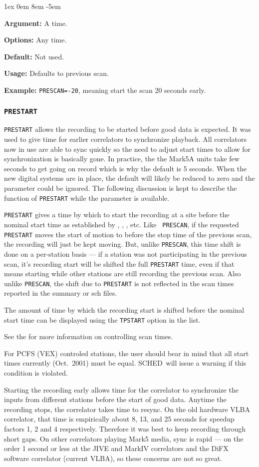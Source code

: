 \documentclass{report}
\newcommand{\schedb}{{\sc SCHED~}}
\newcommand{\rcwbox}[5]{
  \begin{list}{}{\parsep 1ex  \itemsep 0em
                 \leftmargin 8em  \itemindent -5em }
    \item {\bf Argument:} #1
    \item {\bf Options:}  #2
    \item {\bf Default:}  #3
    \item {\bf Usage:}    #4
    \item {\bf Example:}  #5
  \end{list}
}
\begin{document}
\rcwbox
{A time.}
{Any time.}
{Not used.}
{Defaults to previous scan.}
{{\tt PRESCAN=-20}, meaning start the scan 20 seconds early.}

\subsubsection{\label{MP:PRESTART}{\tt PRESTART}}

{\tt PRESTART} allows the recording to be started before good data is
expected.  It was used to give time for earlier correlators to
synchronize playback.  All correlators now in use are able to sync
quickly so the need to adjust start times to allow for synchronization
is basically gone.  In practice, the the Mark5A units take few seconds to get
going on record which is why the default is 5 seconds.  When the
new digital systems are in place, the default will likely be reduced
to zero and the parameter could be ignored.  The following
discussion is kept to describe the function of {\tt PRESTART} while
the parameter is available.

{\tt PRESTART} gives a time by which to start the recording at a
site before the nominal start time as established by , , ,  etc.  Like {\tt
PRESCAN}, if the requested {\tt PRESTART} moves the start of motion to
before the stop time of the previous scan, the recording will just be kept
moving.  But, unlike {\tt PRESCAN}, this time shift is done on a
per-station basis --- if a station was not participating in the
previous scan, it's recording start will be shifted the full
{\tt PRESTART} time, even if that means starting while other stations
are still recording the previous scan.  Also unlike {\tt PRESCAN},
the shift due to {\tt PRESTART} is not reflected in the scan
times reported in the summary or sch files.

The amount of time by which the recording start is shifted before
the nominal start time can be displayed using the {\tt TPSTART} option
in the  list.

See the  for more
information on controlling scan times.

For PCFS (VEX) controled stations, the user should bear in mind that
all start times currently (Oct.\ 2001) must be equal. \schedb will issue
a warning if this condition is violated.

Starting the recording early allows time for the correlator to
synchronize the inputs from different stations before the start of
good data.  Anytime the recording stops, the correlator takes time to
resync.  On the old hardware VLBA correlator, that time is empirically
about 8, 13, and 25 seconds for speedup factors 1, 2 and 4
respectively.  Therefore it was best to keep recording through short
gaps.  On other correlators playing Mark5 media, sync is rapid ---
on the order 1 second or less at the JIVE and MarkIV correlators and the
DiFX software correlator (current VLBA), so these concerns are not so
great.
\end{document}

